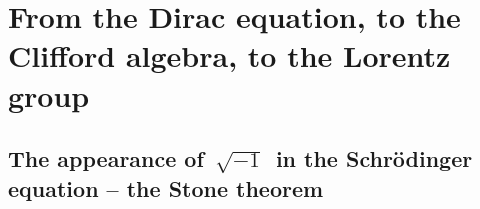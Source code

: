 

\chapter{From the Dirac equation, to the Clifford algebra, to the Lorentz group}
\setcounter{theorem}{0}
\setcounter{equation}{0}


\renewcommand{\theenumi}{\roman{enumi}}
\renewcommand{\labelenumi}{\textnormal{(\theenumi)}$\;\;$}


\section{The {\color{red}appearance of \,$\sqrt{-1}$}\, in the Schr\"odinger equation -- the Stone theorem}

